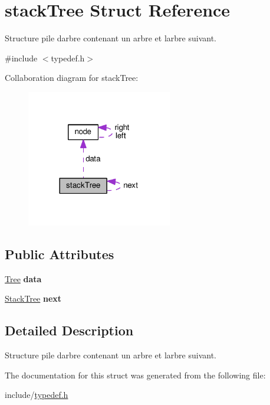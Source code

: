 \hypertarget{structstackTree}{}\section{stack\+Tree Struct Reference}
\label{structstackTree}


Structure pile d\textquotesingle{}arbre contenant un arbre et l\textquotesingle{}arbre suivant.  




{\ttfamily \#include $<$typedef.\+h$>$}



Collaboration diagram for stack\+Tree\+:\nopagebreak
\begin{figure}[H]
\begin{center}
\leavevmode
\includegraphics[width=180pt]{structstackTree__coll__graph}
\end{center}
\end{figure}
\subsection*{Public Attributes}
\begin{DoxyCompactItemize}
\item 
\hyperlink{structnode}{Tree} {\bfseries data}\hypertarget{structstackTree_a0948f3bec59d376fcb496088ef1eb390}{}\label{structstackTree_a0948f3bec59d376fcb496088ef1eb390}

\item 
\hyperlink{structstackTree}{Stack\+Tree} {\bfseries next}\hypertarget{structstackTree_ab01d5af00bf143c04cdb6c03ff3b4fb5}{}\label{structstackTree_ab01d5af00bf143c04cdb6c03ff3b4fb5}

\end{DoxyCompactItemize}


\subsection{Detailed Description}
Structure pile d\textquotesingle{}arbre contenant un arbre et l\textquotesingle{}arbre suivant. 

The documentation for this struct was generated from the following file\+:\begin{DoxyCompactItemize}
\item 
include/\hyperlink{typedef_8h}{typedef.\+h}\end{DoxyCompactItemize}
